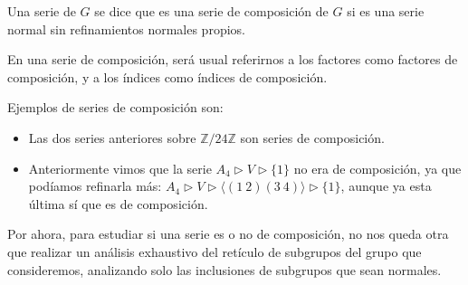 \begin{definicion}
    Una serie de $G$ se dice que es una serie de composición de $G$ si es una serie normal sin refinamientos normales propios.

    \noindent
    En una serie de composición, será usual referirnos a los factores como factores de composición, y a los índices como índices de composición.
\end{definicion}

\begin{ejemplo}
    Ejemplos de series de composición son:
    \begin{itemize}
        \item Las dos series anteriores sobre $\mathbb{Z}/24\mathbb{Z}$ son series de composición.
        \item Anteriormente vimos que la serie $A_4 \rhd V \rhd \{1\}$ no era de composición, ya que podíamos refinarla más: $A_4 \rhd V \rhd \langle (1\ 2)(3\ 4) \rangle \rhd \{1\} $, aunque ya esta última sí que es de composición.
    \end{itemize}
    Por ahora, para estudiar si una serie es o no de composición, no nos queda otra que realizar un análisis exhaustivo del retículo de subgrupos del grupo que consideremos, analizando solo las inclusiones de subgrupos que sean normales.
\end{ejemplo}


